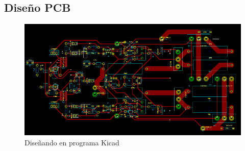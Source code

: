 \documentclass[a4paper,12pt,twoside]{article}
\begin{document}

















\newpage
\subsection{Diseño PCB}

\begin{figure}[H]
    \centering
    \includegraphics[height=0.4\textwidth]{img/PCB/PCB_kicad}
    \caption{Diseñando en programa Kicad}
    \label{fig:ac}
\end{figure}
\end{document}
